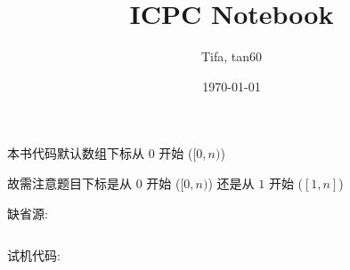 \documentclass{ICPCnotebook}
\title{\vspace{-4ex}\Large{ICPC Notebook}}
\author{Tifa, tan60}
\date{\today}
\begin{document}
    \maketitle

    \pagestyle{plain}

	\setcounter{page}{1}

    \begin{multicols}{2}
        \tableofcontents
    \end{multicols}

    \newpage
    本书代码默认数组下标从 \(0\) 开始 (\([0, n)\))

    故需注意题目下标是从 \(0\) 开始 (\([0, n)\)) 还是从 \(1\) 开始 (\([1, n]\))

    缺省源:

    \inputminted{cpp}{src/src/main.cpp}

    试机代码:

    \inputminted{cpp}{src/src/test.cpp}

    \newpage
	\pagestyle{fancy}
	\setcounter{page}{1}

    
    

    
    
\end{document}
